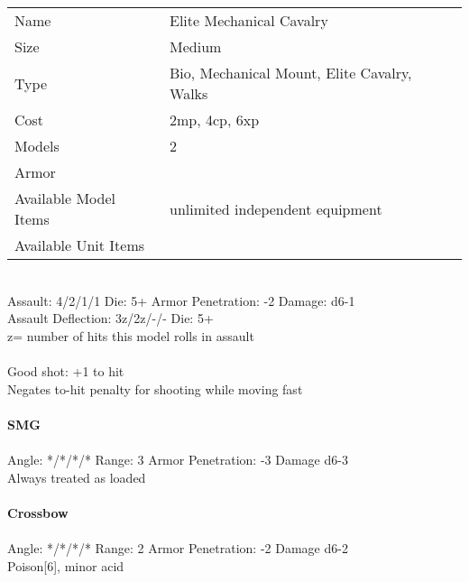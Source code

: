 \begin{tabular}{ll}
  Name & Elite Mechanical Cavalry \\
  Size & Medium\\
  Type & Bio, Mechanical Mount, Elite Cavalry, Walks\\
  Cost & 2mp, 4cp, 6xp\\
  Models & 2\\
  Armor & \\
  Available Model Items & unlimited independent equipment \\
  Available Unit Items &  \\
\end{tabular}

\ \\
Assault: 4/2/1/1 Die: 5+ Armor Penetration: -2 Damage: d6-1 \\
Assault Deflection: 3z/2z/-/- Die: 5+\\
\indent z= number of hits this model rolls in assault \\
\ \\
Good shot: +1 to hit \\ Negates to-hit penalty for shooting while moving fast
\ \\
\ \\
{\bf SMG } \\
\ \\
Angle: */*/*/* Range: 3 Armor Penetration: -3 Damage d6-3 \\
\indent Always treated as loaded \\



\ \\
{\bf Crossbow } \\
\ \\
Angle: */*/*/* Range: 2 Armor Penetration: -2 Damage d6-2 \\
\indent Poison[6], minor acid \\





